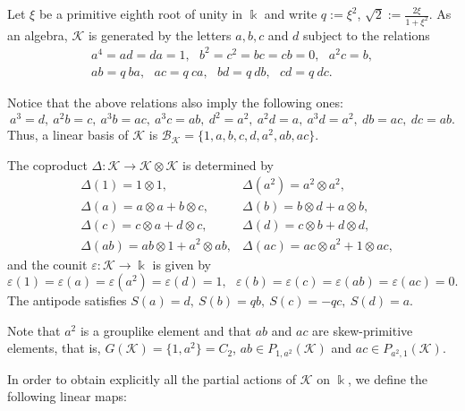 \documentclass[reqno]{amsart}
\theoremstyle{definition}
\numberwithin{equation}{section}\theoremstyle{plain}
\newcommand{\B}{\mathcal{B}}
\theoremstyle{definition}
\def \K {\mathcal{K}}
\begin{document}
 Let \(\xi\) be a primitive eighth root of unity in \(\Bbbk\) and write \(q := \xi^2\), \(\sqrt{2} := \frac{2\xi}{1 + \xi^2}\).
As an algebra, $\K$ is generated by the letters $a, b, c$ and $d$ subject to the relations
\begin{eqnarray*}
a^4 = ad = da = 1, \ \ \ b^2 = c^2 = bc = cb = 0,  \ \ \  a^2 c = b, \\ ab = q \ ba, \ \ \ ac = q \ ca, \ \ \ bd = q \ db,  \ \ \  cd = q \ dc.
\end{eqnarray*}

Notice that the above relations also imply the following ones:
\begin{equation*}
a^3 = d,\ a^2b = c,\ a^3b = ac,\ a^3c = ab,\ d^2 = a^2,\ a^2d = a,\ a^3d = a^2,\ db = ac,\ dc = ab.
\end{equation*}
Thus, a linear basis of $\K$ is $\B_\K = \{1, a, b, c, d, a^2, ab, ac \}$.

\medbreak

The coproduct \(\Delta: \K  \to \K \otimes \K\) is determined by
\begin{eqnarray*}
& \Delta(1)  = 1 \otimes 1,  & \Delta(a^2) = a^2 \otimes a^2, \\ 
& \Delta(a)  = a \otimes a + b \otimes c,  & \Delta(b) = b \otimes d + a \otimes b, \\
& \Delta(c)   = c \otimes a + d \otimes c, &\Delta(d)  = c \otimes b + d \otimes d, \\
& \Delta(ab)  = ab \otimes 1 + a^2 \otimes ab,  & \Delta(ac) = ac \otimes a^2 + 1 \otimes ac, 
\end{eqnarray*}
and the counit \(\varepsilon: \K \to \Bbbk\) is given by
$$
\varepsilon(1) = \varepsilon(a) = \varepsilon(a^2) = \varepsilon(d) = 1, \ \ \ 
\varepsilon(b) = \varepsilon(c) = \varepsilon(ab) = \varepsilon(ac) = 0.
$$
The antipode satisfies \(S(a) = d,\ S(b) = qb,\ S(c) = -qc,\ S(d) = a\).

Note that $a^2$ is a grouplike element and that $ab$ and $ac$ are skew-primitive elements, that is, $G(\K) = \{ 1, a^2 \} = C_2$, $ab \in P_{1, a^2}(\K)$ and $ac \in P_{a^2, 1}(\K)$.

\medbreak

In order to obtain explicitly all the partial actions of $\mathcal{K}$ on $\Bbbk$, we define the following linear maps:
\end{document}
